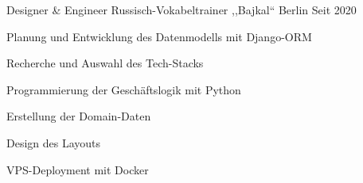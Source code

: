 
\begin{cventries}

  \cventry
  {Designer \& Engineer} %
  {Russisch-Vokabeltrainer ,,Bajkal``} %
  {Berlin} %
  {Seit 2020} %
  {
    \begin{cvitems} %
    \item {Planung und Entwicklung des Datenmodells mit Django-ORM}
    \item {Recherche und Auswahl des Tech-Stacks}
    \item {Programmierung der Geschäftslogik mit Python}
    \item {Erstellung der Domain-Daten}
    \item {Design des Layouts}
    \item {VPS-Deployment mit Docker}
    \end{cvitems}
  }

\end{cventries}
